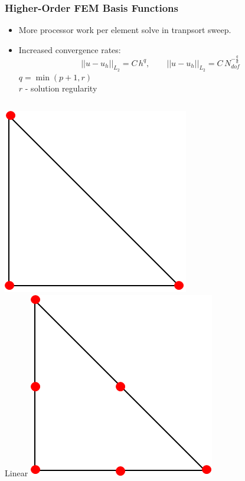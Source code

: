 \documentclass[compress,10pt]{beamer}
\begin{document}
\begin{frame}[t]\frametitle{Higher-Order FEM Basis Functions}
\begin{block}{}
\begin{itemize}
\item More processor work per element solve in tranpsort sweep.
\item Increased convergence rates:
{
\begin{equation*}
|| u - u_h ||_{L_2} = C \, h^{q}, \qquad || u - u_h ||_{L_2} = C \, N_{dof}^{-\frac{q}{d}}
\end{equation*}
\vspace{2mm}
$q = \min(p+1,r)$ \\
$r$ - solution regularity
}
\end{itemize}
\end{block}
\centering
\vspace{3mm}
\centering
\begin{columns}
\centering
{}\includegraphics[width=0.75\columnwidth]{images/ref_tri_dofs_k1.png}\\
Linear
\centering
{}\includegraphics[width=0.75\columnwidth]{images/ref_tri_dofs_k2.png} \\

\end{columns}
\end{frame}
\end{document}
